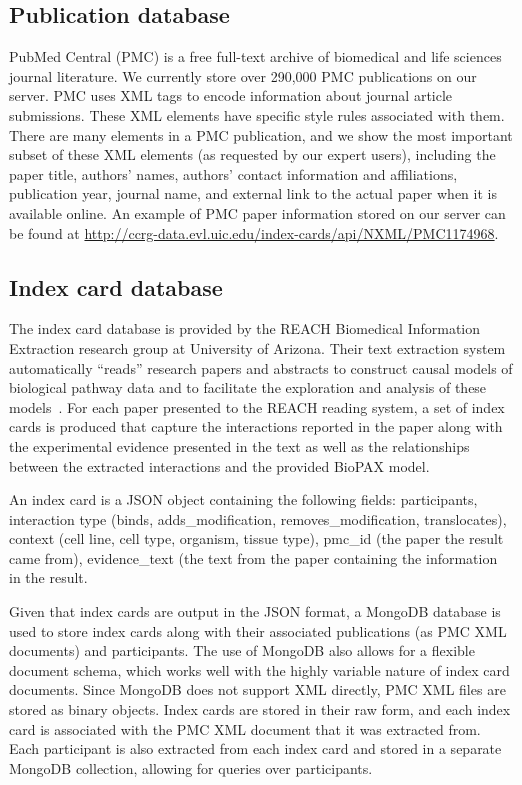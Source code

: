 \documentclass[journal]{vgtc}                %
\begin{document}
\subsection{Publication database}
\label{sec:PMC}
PubMed Central (PMC) is a free full-text archive of biomedical and life sciences journal literature. We currently store over 290,000 PMC publications on our server. PMC uses XML tags to encode information about journal article submissions. These XML elements have specific style rules associated with them. There are many elements in a PMC publication, and we show the most important subset of these XML elements (as requested by our expert users), including the paper title, authors' names, authors' contact information and affiliations, publication year, journal name, and external link to the actual paper when it is available online. An example of PMC paper information stored on our server can be found at \url{http://ccrg-data.evl.uic.edu/index-cards/api/NXML/PMC1174968}.

\subsection{Index card database}
\label{sec:IndexCard}
The index card database is provided by the REACH Biomedical Information Extraction research group at University of Arizona. Their text extraction system automatically ``reads'' research papers and abstracts to construct causal models of biological pathway data and to facilitate the exploration and analysis of these models~\cite{Valenzuela:15,Valenzuela:16}. For each paper presented to the REACH reading system, a set of index cards is produced that capture the interactions reported in the paper along with the experimental evidence presented in the text as well as the relationships between the extracted interactions and the provided BioPAX model. 

An index card is a JSON object containing the following fields: participants, interaction type (binds, adds\_modification, removes\_modification, translocates), context (cell line, cell type, organism, tissue type), pmc\_id (the paper the result came from), evidence\_text (the text from the paper containing the information in the result.

Given that index cards are output in the JSON format, a MongoDB database is used to store index cards along with their associated publications (as PMC XML documents) and participants. The use of MongoDB also allows for a flexible document schema, which works well with the highly variable nature of index card documents. Since MongoDB does not support XML directly, PMC XML files are stored as binary objects. Index cards are stored in their raw form, and each index card is associated with the PMC XML document that it was extracted from. Each participant is also extracted from each index card and stored in a separate MongoDB collection, allowing for queries over participants.
\end{document}
